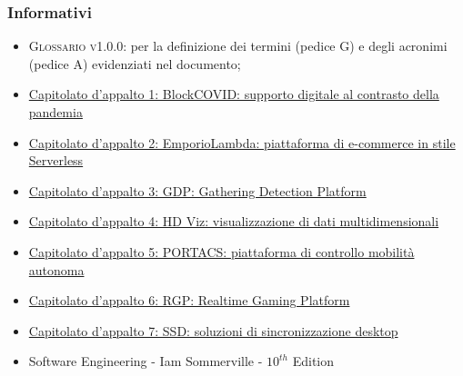 \subsubsection{Informativi}
\begin{itemize}
	\item \textsc{Glossario v1.0.0}: per la definizione dei termini (pedice G) e degli acronimi (pedice A) evidenziati nel documento;
	\item \href{https://www.math.unipd.it/~tullio/IS-1/2020/Progetto/C1.pdf}{Capitolato d'appalto 1: BlockCOVID: supporto digitale al contrasto della pandemia}\\
	\item \href{https://www.math.unipd.it/~tullio/IS-1/2020/Progetto/C2.pdf}{Capitolato d'appalto 2: EmporioLambda: piattaforma di e-commerce in stile Serverless}\\
	\item \href{https://www.math.unipd.it/~tullio/IS-1/2020/Progetto/C3.pdf}{Capitolato d'appalto 3: GDP: Gathering Detection Platform}\\
	\item \href{https://www.math.unipd.it/~tullio/IS-1/2020/Progetto/C4.pdf}{Capitolato d'appalto 4: HD Viz: visualizzazione di dati multidimensionali}\\
	\item \href{https://www.math.unipd.it/~tullio/IS-1/2020/Progetto/C5.pdf}{Capitolato d'appalto 5: PORTACS: piattaforma di controllo mobilità autonoma}\\
    \item \href{https://sesaspa-my.sharepoint.com/:b:/g/personal/s_dindo_vargroup_it/EThvay0f6KVCoXydYOce2lkBt-MYcnW1yafRXFXVIOIsHg?e=2emZZI}{Capitolato d'appalto 6: RGP: Realtime Gaming Platform}\\
	\item \href{https://www.math.unipd.it/~tullio/IS-1/2020/Progetto/C7.pdf}{Capitolato d'appalto 7: SSD: soluzioni di sincronizzazione desktop}\\
	\item Software Engineering - Iam Sommerville - $10^{th}$ Edition
\end{itemize}